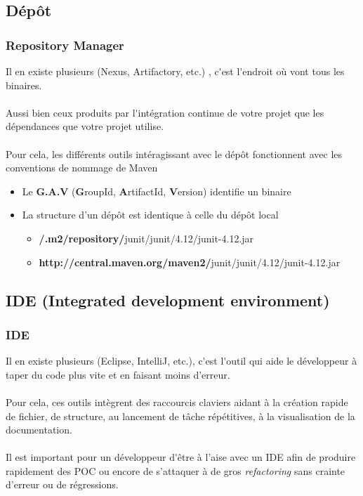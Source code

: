 \subsection{D\'ep\^{o}t}
\begin{frame}
	\frametitle{Repository Manager}
    Il en existe plusieurs (Nexus, Artifactory, etc.) , c\'{}est l\'{}endroit o\`{u} vont tous les binaires.
    \\~\\
    Aussi bien ceux produits par l\'{}int\'{e}gration continue de votre projet que les d\'{e}pendances que votre projet utilise.
    \\~\\
    Pour cela, les diff\'{e}rents outils int\'{e}ragissant avec le d\'{e}p\^{o}t fonctionnent avec les conventions de nommage de Maven
    
\begin{itemize}
	\item Le \textbf{G.A.V} (\textbf{G}roupId, \textbf{A}rtifactId, \textbf{V}ersion) identifie un binaire
    \item La structure d'un d\'ep\^{o}t est identique \`{a} celle du d\'ep\^{o}t local
    \begin{itemize}
    	\item \textbf{\texttildelow{}/.m2/repository/}junit/junit/4.12/junit-4.12.jar
        \item \textbf{http://central.maven.org/maven2/}junit/junit/4.12/junit-4.12.jar
    \end{itemize}
\end{itemize}
\end{frame}

\subsection{IDE (Integrated development environment)}
\begin{frame}
	\frametitle{IDE}
    Il en existe plusieurs (Eclipse, IntelliJ, etc.), c\'{}est l\'{}outil qui aide le d\'{e}veloppeur \`{a} taper du code plus vite et en faisant moins d'erreur.
    \\~\\
    Pour cela, ces outils int\`{e}grent des raccourcis claviers aidant \`{a} la cr\'{e}ation rapide de fichier, de structure, au lancement de t\^{a}che r\'{e}p\'{e}titives, \`{a} la visualisation de la documentation.
    \\~\\
    Il est important pour un d\'{e}veloppeur d\'{}\^{e}tre \`{a} l'aise avec un IDE afin de produire rapidement des POC ou encore de s'attaquer \`{a} de gros \textit{refactoring} sans crainte d'erreur ou de r\'{e}gressions.
\end{frame}

